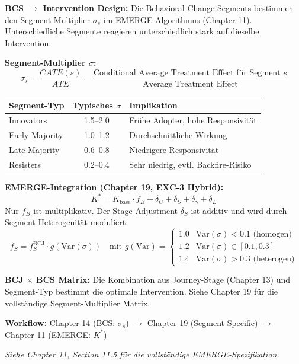 \begin{tcolorbox}[
    colback=blue!5!white,
    colframe=blue!75!black,
    title={\textbf{Cross-Reference: EMERGE Algorithm (Chapter 11, EIT-EMP)}},
    fonttitle=\bfseries
]
\textbf{BCS $\rightarrow$ Intervention Design:} Die Behavioral Change Segments bestimmen den Segment-Multiplier $\sigma_s$ im EMERGE-Algorithmus (Chapter 11). Unterschiedliche Segmente reagieren unterschiedlich stark auf dieselbe Intervention.

\medskip
\textbf{Segment-Multiplier $\sigma$:}
\begin{equation*}
\sigma_s = \frac{CATE(s)}{ATE} = \frac{\text{Conditional Average Treatment Effect für Segment } s}{\text{Average Treatment Effect}}
\end{equation*}

\begin{center}
\begin{tabular}{lcl}
\textbf{Segment-Typ} & \textbf{Typisches $\sigma$} & \textbf{Implikation} \\
\midrule
Innovators & 1.5--2.0 & Frühe Adopter, hohe Responsivität \\
Early Majority & 1.0--1.2 & Durchschnittliche Wirkung \\
Late Majority & 0.6--0.8 & Niedrigere Responsivität \\
Resisters & 0.2--0.4 & Sehr niedrig, evtl. Backfire-Risiko \\
\end{tabular}
\end{center}

\medskip
\textbf{EMERGE-Integration (Chapter 19, EXC-3 Hybrid):}
\[
K^* = K_{\text{base}} \cdot f_B + \delta_C + \delta_S + \delta_\gamma + \delta_L
\]
Nur $f_B$ ist multiplikativ. Der Stage-Adjustment $\delta_S$ ist additiv und wird durch Segment-Heterogenität moduliert:
\[
f_S = f_S^{\text{BCJ}} \cdot g(\text{Var}(\sigma)) \quad \text{mit } g(\text{Var}) = \begin{cases}
1.0 & \text{Var}(\sigma) < 0.1 \text{ (homogen)} \\
1.2 & \text{Var}(\sigma) \in [0.1, 0.3] \\
1.4 & \text{Var}(\sigma) > 0.3 \text{ (heterogen)}
\end{cases}
\]

\medskip
\textbf{BCJ $\times$ BCS Matrix:}
Die Kombination aus Journey-Stage (Chapter 13) und Segment-Typ bestimmt die optimale Intervention. Siehe Chapter 19 für die vollständige Segment-Multiplier Matrix.

\medskip
\textbf{Workflow:} Chapter 14 (BCS: $\sigma_s$) $\rightarrow$ Chapter 19 (Segment-Specific) $\rightarrow$ Chapter 11 (EMERGE: $K^*$)

\medskip
\textit{Siehe Chapter 11, Section 11.5 für die vollständige EMERGE-Spezifikation.}
\end{tcolorbox}



